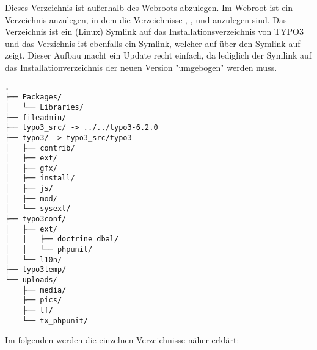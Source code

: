 Dieses Verzeichnis ist außerhalb des Webroots abzulegen. Im Webroot ist ein Verzeichnis  anzulegen, in dem die Verzeichnisse , ,  und  anzulegen sind. Das Verzeichnis  ist ein (Linux) Symlink auf das Installationsverzeichnis von TYPO3 und das Verzichnis  ist ebenfalls ein Symlink, welcher auf über den Symlink  auf  zeigt. Dieser Aufbau macht ein Update recht einfach, da lediglich der Symlink  auf das Installationverzeichnis der neuen Version "umgebogen" werden muss.

\begin{Verbatim}[samepage=true]
.
├── Packages/
│   └── Libraries/
├── fileadmin/
├── typo3_src/ -> ../../typo3-6.2.0
├── typo3/ -> typo3_src/typo3
│   ├── contrib/
│   ├── ext/
│   ├── gfx/
│   ├── install/
│   ├── js/
│   ├── mod/
│   └── sysext/
├── typo3conf/
│   ├── ext/
│   │   ├── doctrine_dbal/
│   │   └── phpunit/
│   └── l10n/
├── typo3temp/
└── uploads/
    ├── media/
    ├── pics/
    ├── tf/
    └── tx_phpunit/
\end{Verbatim}

Im folgenden werden die einzelnen Verzeichnisse näher erklärt:

